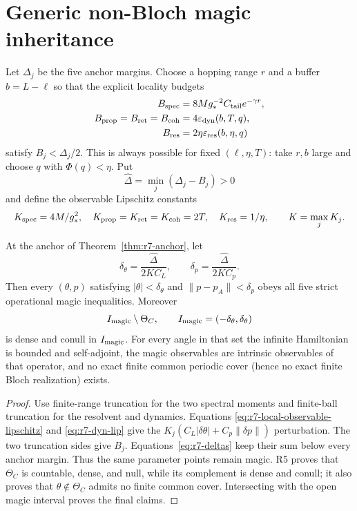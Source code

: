 \section{Generic non-Bloch magic inheritance}
\label{sec:r7-inheritance}

Let $\Delta_j$ be the five anchor margins.  Choose a hopping range $r$ and a
buffer $b=L-\ell$ so that the explicit locality budgets
\begin{align}
 B_{\rm spec}&=8Mg_*^{-2}C_{\rm tail}e^{-\gamma r},\\
 B_{\rm prop}=B_{\rm ret}=B_{\rm coh}&=4\varepsilon_{\rm dyn}(b,T,q),\\
 B_{\rm res}&=2\eta\varepsilon_{\rm res}(b,\eta,q)
 \label{eq:r7-budgets}
\end{align}
satisfy $B_j<\Delta_j/2$.  This is always possible for fixed
$(\ell,\eta,T)$: take $r,b$ large and choose $q$ with
$\Phi(q)<\eta$.  Put
\begin{equation}
 \widehat\Delta=\min_j(\Delta_j-B_j)>0
\end{equation}
and define the observable Lipschitz constants
\begin{equation}
 K_{\rm spec}=4M/g_*^2,\quad
 K_{\rm prop}=K_{\rm ret}=K_{\rm coh}=2T,
 \quad K_{\rm res}=1/\eta,\qquad K=\max_jK_j.
 \label{eq:r7-Kobs}
\end{equation}

\begin{theorem}
\label{thm:r7-inheritance}
At the anchor of Theorem~\ref{thm:r7-anchor}, let
\begin{equation}
 \delta_\theta=\frac{\widehat\Delta}{2KC_L},
 \qquad
 \delta_p=\frac{\widehat\Delta}{2KC_p}.
 \label{eq:r7-deltas}
\end{equation}
Then every $(\theta,p)$ satisfying
$|\theta|<\delta_\theta$ and $\|p-p_A\|<\delta_p$ obeys all five strict
operational magic inequalities.  Moreover
\begin{equation}
 I_{\rm magic}\setminus\Theta_C,
 \qquad I_{\rm magic}=(-\delta_\theta,\delta_\theta)
\end{equation}
is dense and conull in $I_{\rm magic}$.  For every angle in that set the
infinite Hamiltonian is bounded and self-adjoint, the magic observables are
intrinsic observables of that operator, and no exact finite common periodic
cover (hence no exact finite Bloch realization) exists.
\end{theorem}

\begin{proof}
Use finite-range truncation for the two spectral moments and finite-ball
truncation for the resolvent and dynamics.  Equations
\eqref{eq:r7-local-observable-lipschitz} and \eqref{eq:r7-dyn-lip} give the
$K_j(C_L|\delta\theta|+C_p\|\delta p\|)$ perturbation.  The two truncation
sides give $B_j$.  Equations~\eqref{eq:r7-deltas} keep their sum below every
anchor margin.  Thus the same parameter points remain magic.  R5 proves that
$\Theta_C$ is countable, dense, and null, while its complement is dense and
conull; it also proves that $\theta\notin\Theta_C$ admits no finite common
cover.  Intersecting with the open magic interval proves the final claims.
\end{proof}

